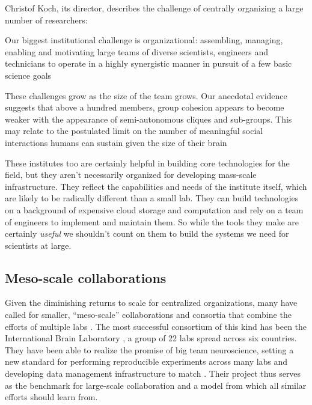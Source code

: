 Christof Koch, its director, describes the challenge of centrally
organizing a large number of researchers:

\begin{leftbar}
Our biggest institutional challenge is organizational: assembling,
managing, enabling and motivating large teams of diverse scientists,
engineers and technicians to operate in a highly synergistic manner in
pursuit of a few basic science goals \citep{grillnerWorldwideInitiativesAdvance2016} 

These challenges grow as the size of the team grows. Our anecdotal
evidence suggests that above a hundred members, group cohesion appears
to become weaker with the appearance of semi-autonomous cliques and
sub-groups. This may relate to the postulated limit on the number of
meaningful social interactions humans can sustain given the size of
their brain \citep{kochBigScienceTeam2016} 
\end{leftbar}

These institutes too are certainly helpful in building core technologies
for the field, but they aren't necessarily organized for developing
mass-scale infrastructure. They reflect the capabilities and needs of
the institute itself, which are likely to be radically different than a
small lab. They can build technologies on a background of expensive
cloud storage and computation and rely on a team of engineers to
implement and maintain them. So while the tools they make are certainly
\emph{useful} we shouldn't count on them to build the systems we need
for scientists at large.

\hypertarget{meso-scale-collaborations}{%
\subsection{Meso-scale collaborations}\label{meso-scale-collaborations}}

Given the diminishing returns to scale for centralized organizations,
many have called for smaller, ``meso-scale'' collaborations and
consortia that combine the efforts of multiple labs \citep{mainenBetterWayCrack2016} . The most successful consortium of this
kind has been the International Brain Laboratory \citep{abbottInternationalLaboratorySystems2017, woolKnowledgeNetworksHow2020} , a group of 22 labs spread across six countries. They have been
able to realize the promise of big team neuroscience, setting a new
standard for performing reproducible experiments across many labs \citep{laboratoryStandardizedReproducibleMeasurement2020}  and
developing data management infrastructure to match \citep{laboratoryDataArchitectureLargescale2020} . Their
project thus serves as the benchmark for large-scale collaboration and a
model from which all similar efforts should learn from.

